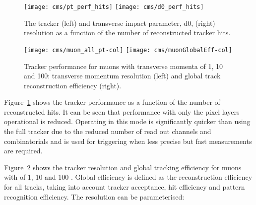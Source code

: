 


\begin{figure}[htb]
  \centering
  \texttt{[image: cms/pt\_perf\_hits]}
  \texttt{[image: cms/d0\_perf\_hits]}
  \caption{The tracker \PT (left) and transverse impact parameter, d0, (right) resolution as a function of the number of reconstructed tracker hits.}
  \label{fig:tracker_perf_hits}
\end{figure}

\begin{figure}[htb]
  \centering
  \texttt{[image: cms/muon\_all\_pt-col]}
  \texttt{[image: cms/muonGlobalEff-col]}
  \caption{Tracker performance for muons with transverse momenta of 1, 10 and 100\GeVc: transverse momentum resolution (left) and global track reconstruction
efficiency (right).~\cite{CMS_TDR_PHYS_vol1}
  \label{fig:tracker_perf}}
\end{figure}

Figure~\ref{fig:tracker_perf_hits} shows the tracker performance as a function of the number of reconstructed hits. It can be seen that performance with only the pixel layers operational is reduced. Operating in this mode is significantly quicker than using the full tracker due to the reduced number of read out channels and combinatorials and is used for triggering when less precise but fast measurements are required.

Figure~\ref{fig:tracker_perf} shows the tracker \PT resolution and global tracking efficiency for muons with \PT of 1, 10 and 100 \GeVc. Global efficiency is defined as the reconstruction efficiency for all tracks, taking into account tracker acceptance, hit efficiency and pattern recognition efficiency. The \PT resolution can be parameterised:

